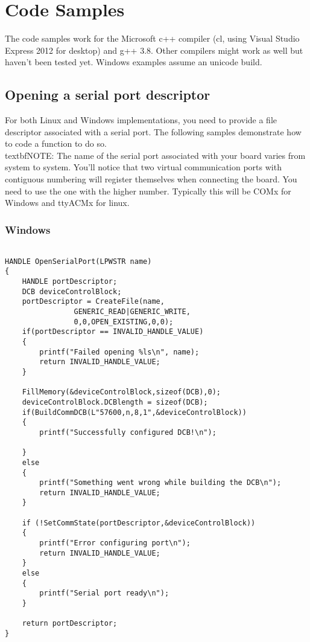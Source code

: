 \documentclass{book}
\begin{document}
\chapter{Code Samples}
The code samples work for the Microsoft c++ compiler (cl, using Visual Studio Express 2012 for desktop) and g++ 3.8. Other compilers might work as well but haven't been tested yet. Windows examples assume an unicode build. \\
\section{Opening a serial port descriptor}
For both Linux and Windows implementations, you need to provide a file descriptor associated with a serial port. The following samples demonstrate how to code a function to do so.\\
textbf{NOTE: }The name of the serial port associated with your board varies from system to system. You'll notice that two virtual communication ports with contiguous numbering will register themselves when connecting the board. You need to use the one with the higher number. Typically this will be COMx for Windows and ttyACMx for linux.\\
\subsection{Windows}
\begin{lstlisting}

HANDLE OpenSerialPort(LPWSTR name)
{
	HANDLE portDescriptor;
	DCB deviceControlBlock;
	portDescriptor = CreateFile(name,
				GENERIC_READ|GENERIC_WRITE,
				0,0,OPEN_EXISTING,0,0);
	if(portDescriptor == INVALID_HANDLE_VALUE)
	{
		printf("Failed opening %ls\n", name);
		return INVALID_HANDLE_VALUE;
	}

	FillMemory(&deviceControlBlock,sizeof(DCB),0);
	deviceControlBlock.DCBlength = sizeof(DCB);
	if(BuildCommDCB(L"57600,n,8,1",&deviceControlBlock))
	{
		printf("Successfully configured DCB!\n");
		
	}
	else
	{
		printf("Something went wrong while building the DCB\n");
		return INVALID_HANDLE_VALUE;
	}

	if (!SetCommState(portDescriptor,&deviceControlBlock))
	{
		printf("Error configuring port\n");
		return INVALID_HANDLE_VALUE;
	}
	else
	{
		printf("Serial port ready\n");
	}
		
	return portDescriptor;
}

\end{lstlisting}
\end{document}
